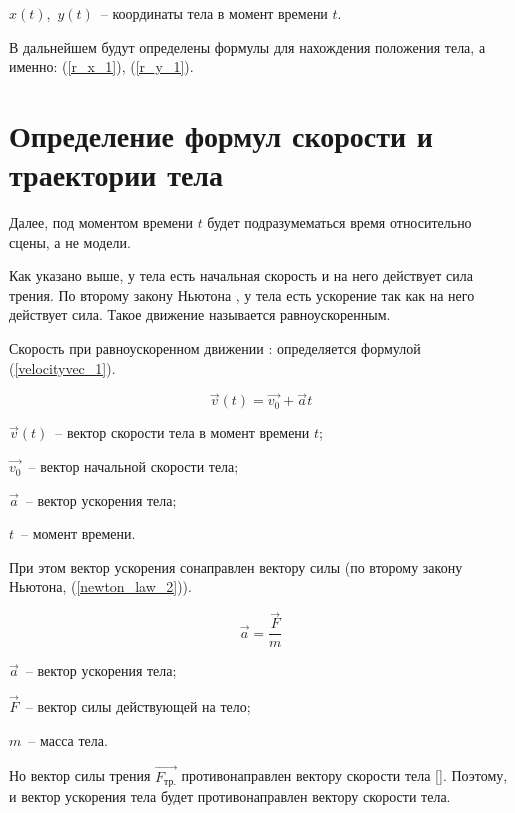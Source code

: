 \begin{Underequation}
  \(x(t)\),~\(y(t)\)~-- координаты тела в момент времени \(t\).
\end{Underequation}

В дальнейшем будут определены формулы для нахождения положения тела, а именно: (\ref{r_x_1}), (\ref{r_y_1}).

\section{Определение формул скорости и траектории тела}

Далее, под моментом времени \(t\) будет подразумематься время относительно сцены, а не модели.

Как указано выше, у тела есть начальная скорость и на него действует сила трения.
По второму закону Ньютона \cite[с.~114]{rowellherbert}, у тела есть ускорение так как на него действует сила.
Такое движение называется равноускоренным.

Скорость при равноускоренном движении \cite[с.~96]{rowellherbert}: определяется формулой (\ref{velocityvec_1}).

\begin{equation}\label{velocityvec_1}
  \vec{v}(t) = \vec{v_0} + \vec{a}t
\end{equation}

\begin{Underequation}
  \(\vec{v}(t)\)~-- вектор скорости тела в момент времени \(t\);

  \(\vec{v_0}\)~-- вектор начальной скорости тела;

  \(\vec{a}\)~-- вектор ускорения тела;

  \(t\)~-- момент времени.
\end{Underequation}

При этом вектор ускорения сонаправлен вектору силы (по второму закону Ньютона, (\ref{newton_law_2})).

\begin{equation}\label{newton_law_2}
  \vec{a} = \frac{\vec{F}}{m}
\end{equation}

\begin{Underequation}
  \(\vec{a}\)~-- вектор ускорения тела;

  \(\vec{F}\)~-- вектор силы действующей на тело;

  \(m\)~-- масса тела.
\end{Underequation}

Но вектор силы трения \(\vec{F_{\text{тр.}}}\) противонаправлен вектору скорости тела [\TODO].
Поэтому, и вектор ускорения тела будет противонаправлен вектору скорости тела.


